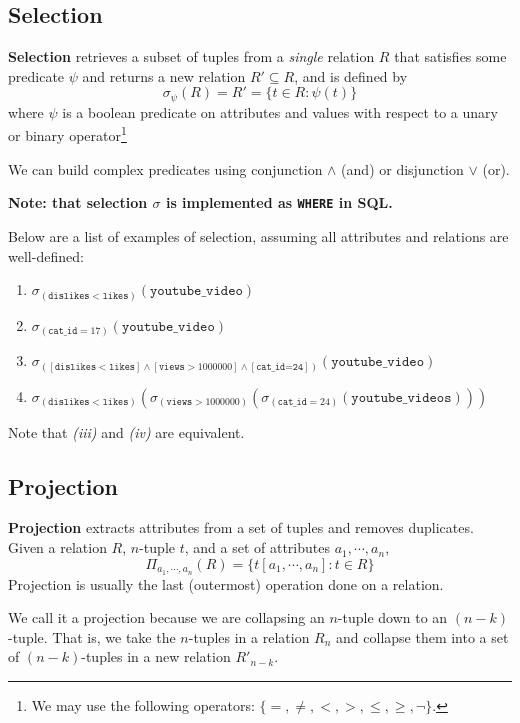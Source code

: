 \documentclass{report}
\newenvironment{definition}[1]{\begin{tcolorbox}[title={Definition: #1}]}{\end{tcolorbox}}
\newenvironment{aside}[1]{\begin{tcolorbox}[title={Aside: #1},colback=blue!5!white,colframe=black!75!blue]}{\end{tcolorbox}}
\renewcommand{\bf}[1]{\textbf{{#1}}}
\renewcommand{\tt}[1]{\texttt{{#1}}}
\renewcommand{\it}[1]{\textit{{#1}}}
\begin{document}
\subsection{Selection}
\begin{definition}{Selection}
    \bf{Selection} retrieves a subset of tuples from a \it{single} relation $R$ that satisfies some
    predicate $\psi$ and returns a new relation $R' \subseteq R$, and is defined by
    \[\sigma_{\psi}(R) = R' = \{ t \in R : \psi(t) \}\]
    where $\psi$ is a boolean predicate on attributes and values with respect to a unary or binary 
    operator\footnote{We may use the following operators: $\{=, \neq, <, >, \leq, \geq, \lnot \}$.}
\end{definition}
We can build complex predicates using conjunction $\land$ (and) or disjunction $\lor$ (or). 
\begin{center}\bf{Note: that selection $\sigma$ is implemented as \tt{WHERE} in SQL.} \end{center}
Below are a list of examples of selection, assuming all attributes and relations are well-defined:
\begin{enumerate}[label=\textit{(\roman*)}]
    \item $\sigma_{(\tt{dislikes} < \tt{likes})}(\tt{youtube\_video})$
    \item $\sigma_{(\tt{cat\_id} = 17)}(\tt{youtube\_video})$
    \item $\sigma_{([\tt{dislikes} < \tt{likes}] \land [\tt{views} > 1000000] \land [\tt{cat\_id=24}])}(\tt{youtube\_video})$
    \item $\sigma_{(\tt{dislikes} < \tt{likes})}(\sigma_{(\tt{views} > 1000000)}(\sigma_{(\tt{cat\_id} = 24)}(\tt{youtube\_videos})))$
\end{enumerate}
Note that \it{(iii)} and \it{(iv)} are equivalent.

\subsection{Projection}
\begin{definition}{Projection}
    \bf{Projection} extracts attributes from a set of tuples and removes duplicates. Given a 
    relation $R$, $n$-tuple $t$, and a set of attributes $a_1, \cdots, a_n$,
    \[\Pi_{a_1, \cdots, a_n}(R) = \{ t[a_1, \cdots, a_n] : t \in R \}\]
    Projection is usually the last (outermost) operation done on a relation.
\end{definition}
\begin{aside}{Projection?}
    We call it a projection because we are collapsing an $n$-tuple down to an $(n - k)$-tuple. That
    is, we take the $n$-tuples in a relation $R_n$ and collapse them into a set of $(n-k)$-tuples 
    in a new relation $R'_{n - k}$. 
\end{aside}


\end{document}
